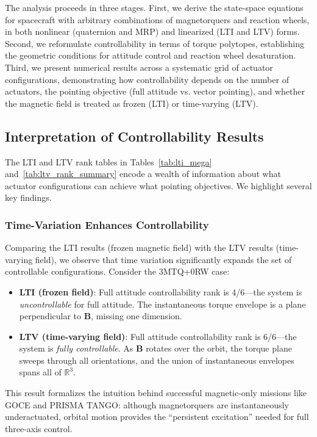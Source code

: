 \documentclass[conference]{IEEEtran}
\begin{document}
The analysis proceeds in three stages. First, we derive the state-space equations for spacecraft with arbitrary combinations of magnetorquers and reaction wheels, in both nonlinear (quaternion and MRP) and linearized (LTI and LTV) forms. Second, we reformulate controllability in terms of torque polytopes, establishing the geometric conditions for attitude control and reaction wheel desaturation. Third, we present numerical results across a systematic grid of actuator configurations, demonstrating how controllability depends on the number of actuators, the pointing objective (full attitude vs. vector pointing), and whether the magnetic field is treated as frozen (LTI) or time-varying (LTV).



\subsection{Interpretation of Controllability Results}\label{subsec:ltiltv_interpretation}

The LTI and LTV rank tables in Tables~\ref{tab:lti_mega} and~\ref{tab:ltv_rank_summary} encode a wealth of information about what actuator configurations can achieve what pointing objectives. We highlight several key findings.

\subsubsection{Time-Variation Enhances Controllability}
Comparing the LTI results (frozen magnetic field) with the LTV results (time-varying field), we observe that time variation significantly expands the set of controllable configurations. Consider the 3MTQ+0RW case:
\begin{itemize}
    \item \textbf{LTI (frozen field)}: Full attitude controllability rank is 4/6---the system is \emph{uncontrollable} for full attitude. The instantaneous torque envelope is a plane perpendicular to $\mathbf{B}$, missing one dimension.
    \item \textbf{LTV (time-varying field)}: Full attitude controllability rank is 6/6---the system is \emph{fully controllable}. As $\mathbf{B}$ rotates over the orbit, the torque plane sweeps through all orientations, and the union of instantaneous envelopes spans all of $\mathbb{R}^3$.
\end{itemize}
This result formalizes the intuition behind successful magnetic-only missions like GOCE and PRISMA TANGO: although magnetorquers are instantaneously underactuated, orbital motion provides the ``persistent excitation'' needed for full three-axis control.
\end{document}
